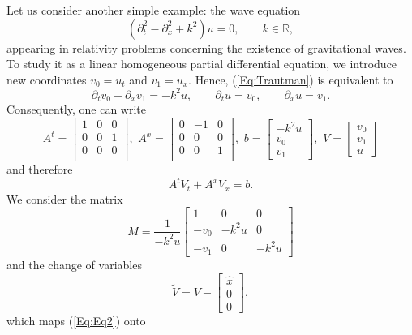 \documentclass{birkjour}
\theoremstyle{definition}
\theoremstyle{remark}
\numberwithin{equation}{section}
\numberwithin{equation}{section}
\numberwithin{thm}{section}
\numberwithin{equation}{section}
\numberwithin{thm}{section}
\begin{document}
Let us consider another simple example:  the wave equation
\begin{equation}\label{Eq:Trautman}
	(\partial^2_t-\partial^2_x+k^2)u=0,\qquad k\in \mathbb{R},
\end{equation}
appearing in relativity problems concerning the existence of gravitational waves. To study it as a linear homogeneous partial differential equation, we introduce new coordinates $v_0=u_t$ and $v_1=u_x$. Hence, (\ref{Eq:Trautman}) is equivalent to 
$$
\partial_t v_0-\partial_x v_1=-k^2u,\qquad \partial_tu=v_0,\qquad \partial_xu=v_1.
$$
Consequently, one can write
$$
A^t=\left[\begin{array}{ccc}1&0&0\\0&0&1\\0&0&0\\\end{array}\right],\,\, A^x=\left[\begin{array}{ccc}0&-1&0\\0&0&0\\0&0&1\\\end{array}\right],\,\, b=\left[\begin{array}{c}-k^2u\\v_0\\v_1\end{array}\right],\,\, V=\left[\begin{array}{c}v_0\\v_1\\u\end{array}\right]
$$
and therefore 
\begin{equation}\label{Eq:Eq2}
	A^tV_t+A^xV_x=b.
\end{equation}
We consider the matrix 
$$
M=\frac{1}{-k^2u}\left[\begin{array}{ccc}1&0&0\\-v_0&-k^2u&0\\-v_1&0&-k^2u\end{array}\right]
$$
and the change of variables
$$
\widetilde{V}=V-\left[\begin{array}{c}\widehat{x}\\0\\0
\end{array}\right],
$$
which maps (\ref{Eq:Eq2})  onto
\end{document}
